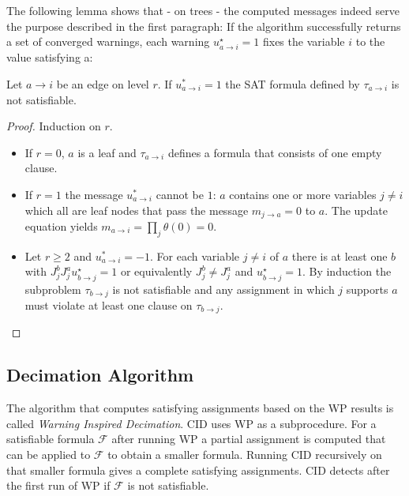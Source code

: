 The following lemma shows that - on trees - the computed messages indeed serve the purpose described in the first paragraph: If the algorithm successfully returns a set of converged warnings, each warning $u^{\star}_{a \rightarrow i} = 1$ fixes the variable $i$ to the value satisfying a:

\begin{lemma}\cite{survprob} Let $a \rightarrow i$ be an edge on level $r$. \newline
If $u^{\ast}_{a \rightarrow i} = 1$ the SAT formula defined by $\tau_{a \rightarrow i}$ is not satisfiable.

\begin{proof} Induction on $r$.
\begin{itemize}
	\item If $r = 0$, $a$ is a leaf and $\tau_{a \rightarrow i}$ defines a formula that consists of one empty clause.
	\item If $r = 1$ the message $u^{\ast}_{a \rightarrow i}$ cannot be $1$: $a$ contains one or more variables $j \neq i$ which all are leaf nodes that pass the message $m_{j \rightarrow a} = 0$ to $a$. The update equation yields $m_{a \rightarrow i} = \prod_j \theta(0) = 0$.
	\item Let $r \geq 2$ and $u^{\ast}_{a \rightarrow i} = -1$. For each variable $j \neq i$ of $a$ there is at least one $b$ with $J_j^b J_j^a u^\star_{b \rightarrow j}= 1$ or equivalently $J_j^b \neq J_j^a$ and  $u^\star_{b \rightarrow j} = 1$. By induction the subproblem $\tau_{b \rightarrow j}$ is not satisfiable and any assignment in which $j$ supports $a$ must violate at least one clause on $\tau_{b \rightarrow j}$.
\end{itemize}
\end{proof}
\end{lemma}



\subsection{Decimation Algorithm}

The algorithm that computes satisfying assignments based on the WP results is called \emph{Warning Inspired Decimation}. CID uses WP as a subprocedure. For a satisfiable formula $\mathcal{F}$ after running WP a partial assignment is computed that can be applied to $\mathcal{F}$ to obtain a smaller formula. Running CID recursively on that smaller formula gives a complete satisfying assignments. CID detects after the first run of WP if $\mathcal{F}$ is not satisfiable.

